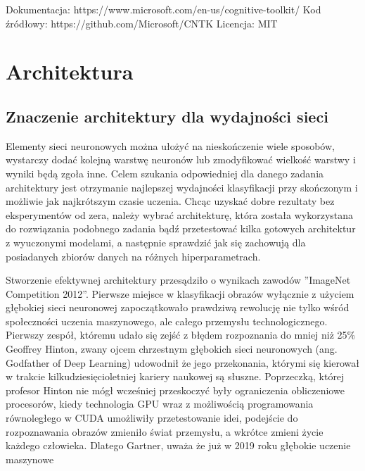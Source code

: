 \documentclass[12pt,a4paper,twoside,titlepage,openright]{book}
\begin{document}
\noindent
\newline
Dokumentacja: https://www.microsoft.com/en-us/cognitive-toolkit/
\newline
Kod źródłowy: https://github.com/Microsoft/CNTK
\newline
Licencja: MIT



\chapter{Architektura}
\section{Znaczenie architektury dla wydajności sieci}
Elementy sieci neuronowych można ułożyć na nieskończenie wiele sposobów, wystarczy dodać kolejną warstwę neuronów lub zmodyfikować wielkość warstwy i wyniki będą zgoła inne. Celem szukania odpowiedniej dla danego zadania architektury jest otrzymanie najlepszej wydajności klasyfikacji przy skończonym i możliwie jak najkrótszym czasie uczenia. Chcąc uzyskać dobre rezultaty bez eksperymentów od zera, należy wybrać architekturę, która została wykorzystana do rozwiązania podobnego zadania bądź przetestować kilka gotowych architektur z wyuczonymi modelami, a następnie sprawdzić jak się zachowują dla posiadanych zbiorów danych na różnych hiperparametrach.

Stworzenie efektywnej architektury przesądziło o wynikach zawodów ''ImageNet Competition 2012''. Pierwsze miejsce w klasyfikacji obrazów wyłącznie z użyciem głębokiej sieci neuronowej zapoczątkowało prawdziwą rewolucję nie tylko wśród społeczności uczenia maszynowego, ale całego przemysłu technologicznego. Pierwszy zespół, któremu udało się zejść z błędem rozpoznania do mniej niż 25\% Geoffrey Hinton, zwany ojcem chrzestnym głębokich sieci neuronowych (ang. Godfather of Deep Learning) udowodnił że jego przekonania, którymi się kierował w trakcie kilkudziesięcioletniej kariery naukowej są słuszne. Poprzeczką, której profesor Hinton nie mógł wcześniej przeskoczyć były ograniczenia obliczeniowe procesorów, kiedy technologia GPU wraz z możliwością programowania równoległego w CUDA umożliwiły przetestowanie idei, podejście do rozpoznawania obrazów zmieniło świat przemysłu, a wkrótce zmieni życie każdego człowieka. Dlatego Gartner, uważa że już w 2019 roku głębokie uczenie maszynowe 
\end{document}
